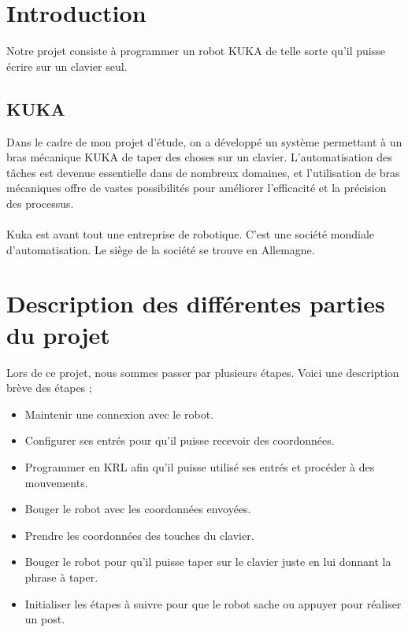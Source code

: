 \section{Introduction}

Notre projet consiste à programmer un robot KUKA de telle sorte qu'il puisse écrire sur un clavier seul.


\subsection{KUKA}

\lettrine[nindent=0em,lines=3]{D}ans le cadre de mon projet d'étude, on a développé un système permettant à un bras mécanique KUKA de taper des choses sur un clavier.
L'automatisation des tâches est devenue essentielle dans de nombreux domaines, et l'utilisation de bras mécaniques offre de vastes possibilités pour améliorer l'efficacité et la précision des processus.
\\
\\
Kuka est avant tout une entreprise de robotique.
C'est une société mondiale d'automatisation.
Le siège de la société se trouve en Allemagne.

\section{Description des différentes parties du projet}

Lors de ce projet, nous sommes passer par plusieurs étapes.
Voici une description brève des étapes ;

\begin{itemize}
    \item Maintenir une connexion avec le robot.
    \item Configurer ses entrés pour qu'il puisse recevoir des coordonnées.
    \item Programmer en KRL afin qu'il puisse utilisé ses entrés et procéder à des mouvements.
    \item Bouger le robot avec les coordonnées envoyées.
    \item Prendre les coordonnées des touches du clavier.
    \item Bouger le robot pour qu'il puisse taper sur le clavier juste en lui donnant la phrase à taper.
    \item Initialiser les étapes à suivre pour que le robot sache ou appuyer pour réaliser un post.
\end{itemize}


